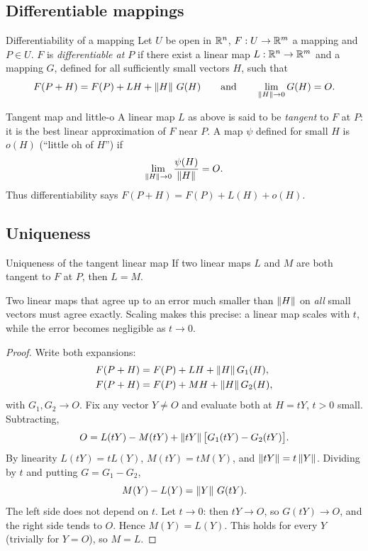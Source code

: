 \subsection{Differentiable mappings}

\begin{definition}{Differentiability of a mapping}
Let $U$ be open in $\mathbb{R}^n$, $F:U\to\mathbb{R}^m$ a mapping and $P\in U$. $F$ is \emph{differentiable at
$P$} if there exist a linear map $L:\mathbb{R}^n\to\mathbb{R}^m$ and a mapping $G$, defined for all
sufficiently small vectors $H$, such that
\[ F(P+H)=F(P)+LH+\left\lVert H\right\rVert\,G(H)\qquad\text{and}\qquad \lim_{\left\lVert H\right\rVert\to0}G(H)=O . \]
\end{definition}

\begin{definition}{Tangent map and little-o}
A linear map $L$ as above is said to be \emph{tangent} to $F$ at $P$: it is the best linear
approximation of $F$ near $P$. A map $\psi$ defined for small $H$ is $o(H)$ (``little oh of
$H$'') if
\[ \lim_{\left\lVert H\right\rVert\to0}\frac{\psi(H)}{\left\lVert H\right\rVert}=O . \]
Thus differentiability says $F(P+H)=F(P)+L(H)+o(H)$.
\end{definition}

\subsection{Uniqueness}

\begin{theorem}[label=thm:unique]{Uniqueness of the tangent linear map}
If two linear maps $L$ and $M$ are both tangent to $F$ at $P$, then $L=M$.
\end{theorem}

\begin{intuition}
Two linear maps that agree up to an error much smaller than $\left\lVert H\right\rVert$ on \emph{all} small vectors
must agree exactly. Scaling makes this precise: a linear map scales with $t$, while the error
becomes negligible as $t\to0$.
\end{intuition}

\begin{proof}
Write both expansions:
\begin{align*} F(P+H)&=F(P)+LH+\left\lVert H\right\rVert G_1(H),\\ F(P+H)&=F(P)+MH+\left\lVert H\right\rVert G_2(H), \end{align*}
with $G_1,G_2\to O$. Fix any vector $Y\neq O$ and evaluate both at $H=tY$, $t>0$ small. Subtracting,
\[ O=L(tY)-M(tY)+\left\lVert tY\right\rVert\big[G_1(tY)-G_2(tY)\big]. \]
By linearity $L(tY)=tL(Y)$, $M(tY)=tM(Y)$, and $\left\lVert tY\right\rVert=t\left\lVert Y\right\rVert$. Dividing by $t$ and putting
$G=G_1-G_2$,
\[ M(Y)-L(Y)=\left\lVert Y\right\rVert\,G(tY). \]
The left side does not depend on $t$. Let $t\to0$: then $tY\to O$, so $G(tY)\to O$, and the right
side tends to $O$. Hence $M(Y)=L(Y)$. This holds for every $Y$ (trivially for $Y=O$), so $M=L$.
\end{proof}

